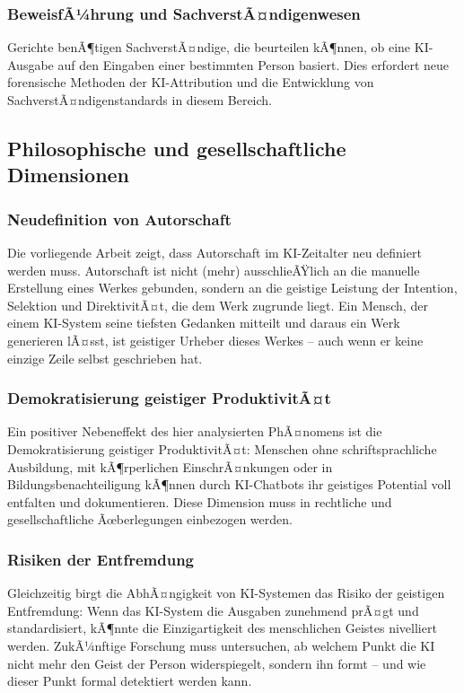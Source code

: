 ﻿\documentclass[a4paper,12pt]{article}
\theoremstyle{definition}
\begin{document}
\subsubsection{BeweisfÃ¼hrung und SachverstÃ¤ndigenwesen}

Gerichte benÃ¶tigen SachverstÃ¤ndige, die beurteilen kÃ¶nnen, ob eine KI-Ausgabe auf den
Eingaben einer bestimmten Person basiert. Dies erfordert neue forensische Methoden der
KI-Attribution und die Entwicklung von SachverstÃ¤ndigenstandards in diesem Bereich.

\subsection{Philosophische und gesellschaftliche Dimensionen}

\subsubsection{Neudefinition von Autorschaft}

Die vorliegende Arbeit zeigt, dass Autorschaft im KI-Zeitalter neu definiert werden
muss. Autorschaft ist nicht (mehr) ausschlieÃŸlich an die manuelle Erstellung eines
Werkes gebunden, sondern an die geistige Leistung der Intention, Selektion und
DirektivitÃ¤t, die dem Werk zugrunde liegt. Ein Mensch, der einem KI-System seine
tiefsten Gedanken mitteilt und daraus ein Werk generieren lÃ¤sst, ist geistiger Urheber
dieses Werkes -- auch wenn er keine einzige Zeile selbst geschrieben hat.

\subsubsection{Demokratisierung geistiger ProduktivitÃ¤t}

Ein positiver Nebeneffekt des hier analysierten PhÃ¤nomens ist die Demokratisierung
geistiger ProduktivitÃ¤t: Menschen ohne schriftsprachliche Ausbildung, mit kÃ¶rperlichen
EinschrÃ¤nkungen oder in Bildungsbenachteiligung kÃ¶nnen durch KI-Chatbots ihr geistiges
Potential voll entfalten und dokumentieren. Diese Dimension muss in rechtliche und
gesellschaftliche Ãœberlegungen einbezogen werden.

\subsubsection{Risiken der Entfremdung}

Gleichzeitig birgt die AbhÃ¤ngigkeit von KI-Systemen das Risiko der geistigen Entfremdung:
Wenn das KI-System die Ausgaben zunehmend prÃ¤gt und standardisiert, kÃ¶nnte die Einzigartigkeit
des menschlichen Geistes nivelliert werden. ZukÃ¼nftige Forschung muss untersuchen, ab welchem
Punkt die KI nicht mehr den Geist der Person widerspiegelt, sondern ihn formt -- und wie
dieser Punkt formal detektiert werden kann.
\end{document}
